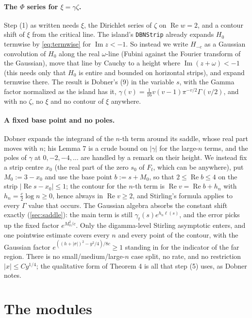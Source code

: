 \documentclass[11pt]{article}
\theoremstyle{definition}
\newcommand{\lean}[1]{\texttt{#1}}
\newcommand{\Hfun}{H}
\newcommand{\re}{\operatorname{Re}}
\newcommand{\im}{\operatorname{Im}}
\begin{document}
\paragraph{The $\Phi$ series for $\xi = \gamma\zeta$.} Step (1) as written needs $\xi$, the Dirichlet series of $\zeta$ on $\re w = 2$, and a contour shift of $\xi$ from the critical line. The island's \lean{DBNStrip} already expands $\Hfun_0$ termwise by \eqref{eq:termwise} for $\im z < -1$. So instead we write $\Hfun_{-c}$ as a Gaussian convolution of $\Hfun_0$ along the real $\omega$-line (Fubini against the Fourier transform of the Gaussian), move that line by Cauchy to a height where $\im(z + \omega) < -1$ (this needs only that $\Hfun_0$ is entire and bounded on horizontal strips), and expand termwise there. The result is Dobner's (9) in the variable $s$, with the Gamma factor normalized as the island has it, $\gamma(v) = \tfrac1{16}v(v-1)\pi^{-v/2}\Gamma(v/2)$, and with no $\zeta$, no $\xi$ and no contour of $\xi$ anywhere.

\paragraph{A fixed base point and no poles.} Dobner expands the integrand of the $n$-th term around its saddle, whose real part moves with $n$; his Lemma 7 is a crude bound on $|\gamma|$ for the large-$n$ terms, and the poles of $\gamma$ at $0, -2, -4, \dots$ are handled by a remark on their height. We instead fix a strip centre $x_0$ (the real part of the zero $s_0$ of $F_t$, which can be anywhere), put $M_0 := 3 - x_0$ and use the base point $b := s + M_0$, so that $2 \le \re b \le 4$ on the strip $|\re s - x_0| \le 1$; the contour for the $n$-th term is $\re v = \re b + h_n$ with $h_n = \tfrac{c}{2}\log n \ge 0$, hence always in $\re v \ge 2$, and Stirling's formula applies to every $\Gamma$ value that occurs. The Gaussian algebra absorbs the constant shift exactly (\cref{sec:saddle}): the main term is still $\gamma_t(s)e^{h_n\ell(s)}$, and the error picks up the fixed factor $e^{M_0^2/c}$. Only the digamma-level Stirling asymptotic enters, and one pointwise estimate covers every $n$ and every point of the contour, with the Gaussian factor $e^{((h+|\sigma|)^2 - y^2/4)/8c} \ge 1$ standing in for the indicator of the far region. There is no small/medium/large-$n$ case split, no rate, and no restriction $|x| \le Cy^{1/4}$; the qualitative form of Theorem 4 is all that step (5) uses, as Dobner notes.

\section{The modules}\label{sec:modules}
\end{document}
